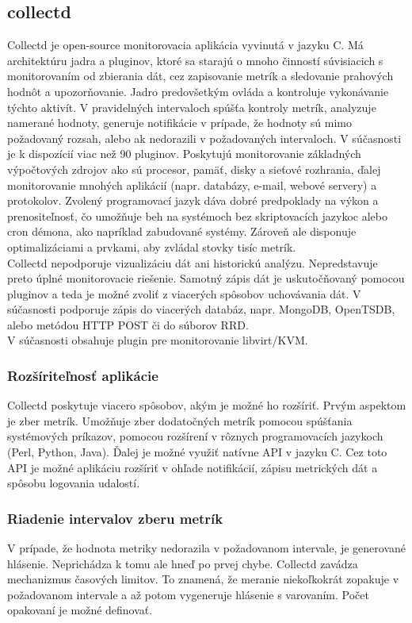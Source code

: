 \documentclass[12pt,twoside,color,cover,table]{fithesis3}
\begin{document}
\subsection{collectd}
Collectd je open-source monitorovacia aplikácia vyvinutá v jazyku C. Má architektúru jadra a pluginov, ktoré sa starajú o mnoho činností súvisiacich s monitorovaním od zbierania dát, cez
zapisovanie metrík a sledovanie prahových hodnôt a upozorňovanie. Jadro predovšetkým ovláda a kontroluje vykonávanie týchto aktivít. V pravidelných intervaloch spúšťa kontroly metrík, 
analyzuje namerané hodnoty, generuje notifikácie v prípade, že hodnoty sú mimo požadovaný rozsah, alebo ak nedorazili 
v požadovaných intervaloch. V súčasnosti je k dispozícií viac než 90 pluginov. Poskytujú monitorovanie základných výpočtových zdrojov ako sú procesor, pamäť, disky a sieťové rozhrania, ďalej monitorovanie
mnohých aplikácií (napr. databázy, e-mail, webové servery) a protokolov. Zvolený programovací jazyk dáva dobré predpoklady na výkon a prenositeľnosť, čo umožňuje beh na systémoch bez 
skriptovacích jazykoc alebo cron démona, ako napríklad zabudované systémy. Zároveň ale disponuje optimalizáciami a prvkami, aby zvládal stovky tisíc metrík. %
\\Collectd nepodporuje vizualizáciu dát ani historickú analýzu. Nepredstavuje preto úplné monitorovacie riešenie. Samotný zápis dát je uskutočňovaný pomocou pluginov a 
teda je možné zvoliť z viacerých spôsobov uchovávania dát. V súčasnosti podporuje zápis do viacerých databáz, napr. MongoDB, OpenTSDB, alebo metódou HTTP POST či do súborov RRD. 
\\V súčasnosti obsahuje plugin pre monitorovanie libvirt/KVM.

\subsubsection{Rozšíriteľnosť aplikácie}
Collectd poskytuje viacero spôsobov, akým je možné ho rozšíriť. Prvým aspektom je zber metrík. Umožňuje zber dodatočných metrík pomocou
spúšťania systémových príkazov, pomocou rozšírení v rôznych programovacích jazykoch (Perl, Python, Java). Ďalej je možné využiť natívne
API v jazyku C. Cez toto API je možné aplikáciu rozšíriť v ohľade notifikácií, zápisu metrických dát a spôsobu logovania udalostí.

\subsubsection{Riadenie intervalov zberu metrík}
V prípade, že hodnota metriky nedorazila v požadovanom intervale, je generované hlásenie. Neprichádza k tomu ale hneď po prvej chybe. Collectd zavádza mechanizmus časových limitov.
To znamená, že meranie niekoľkokrát zopakuje v požadovanom intervale a až potom vygeneruje hlásenie s varovaním. Počet opakovaní
je možné definovať. 
\end{document}
